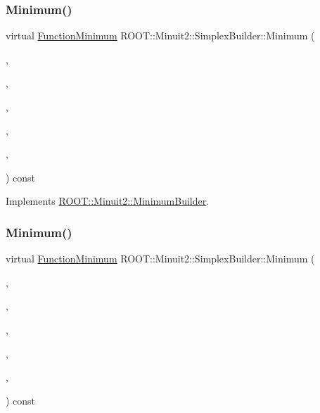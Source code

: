\subsubsection{\texorpdfstring{Minimum()}{Minimum()}\hspace{0.1cm}{\footnotesize\ttfamily [2/3]}}
{\footnotesize\ttfamily virtual \mbox{\hyperlink{classROOT_1_1Minuit2_1_1FunctionMinimum}{Function\+Minimum}} R\+O\+O\+T\+::\+Minuit2\+::\+Simplex\+Builder\+::\+Minimum (\begin{DoxyParamCaption}\item[{const \mbox{\hyperlink{classROOT_1_1Minuit2_1_1MnFcn}{Mn\+Fcn}} \&}]{,  }\item[{const \mbox{\hyperlink{classROOT_1_1Minuit2_1_1GradientCalculator}{Gradient\+Calculator}} \&}]{,  }\item[{const \mbox{\hyperlink{classROOT_1_1Minuit2_1_1MinimumSeed}{Minimum\+Seed}} \&}]{,  }\item[{const \mbox{\hyperlink{classROOT_1_1Minuit2_1_1MnStrategy}{Mn\+Strategy}} \&}]{,  }\item[{unsigned int}]{,  }\item[{double}]{ }\end{DoxyParamCaption}) const\hspace{0.3cm}{\ttfamily [virtual]}}



Implements \mbox{\hyperlink{classROOT_1_1Minuit2_1_1MinimumBuilder_aefaa624436afa8195af1f3393a35981f}{R\+O\+O\+T\+::\+Minuit2\+::\+Minimum\+Builder}}.

\mbox{\label{classROOT_1_1Minuit2_1_1SimplexBuilder_a68ea5d16ee89941e9674eb673dbde593}} 
\subsubsection{\texorpdfstring{Minimum()}{Minimum()}\hspace{0.1cm}{\footnotesize\ttfamily [3/3]}}
{\footnotesize\ttfamily virtual \mbox{\hyperlink{classROOT_1_1Minuit2_1_1FunctionMinimum}{Function\+Minimum}} R\+O\+O\+T\+::\+Minuit2\+::\+Simplex\+Builder\+::\+Minimum (\begin{DoxyParamCaption}\item[{const \mbox{\hyperlink{classROOT_1_1Minuit2_1_1MnFcn}{Mn\+Fcn}} \&}]{,  }\item[{const \mbox{\hyperlink{classROOT_1_1Minuit2_1_1GradientCalculator}{Gradient\+Calculator}} \&}]{,  }\item[{const \mbox{\hyperlink{classROOT_1_1Minuit2_1_1MinimumSeed}{Minimum\+Seed}} \&}]{,  }\item[{const \mbox{\hyperlink{classROOT_1_1Minuit2_1_1MnStrategy}{Mn\+Strategy}} \&}]{,  }\item[{unsigned int}]{,  }\item[{double}]{ }\end{DoxyParamCaption}) const\hspace{0.3cm}{\ttfamily [virtual]}}




